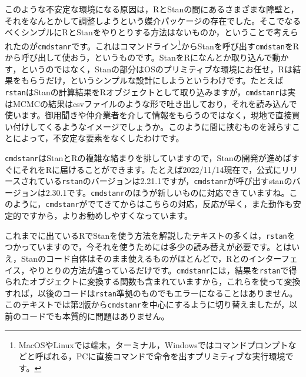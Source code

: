 \documentclass{ltjsbook}
\begin{document}
このような不安定な環境になる原因は，RとStanの間にあるさまざまな障壁と，それをなんとかして調整しようという媒介パッケージの存在でした。そこでなるべくシンプルにRとStanをやりとりする方法はないものか，ということで考えられたのが\verb|cmdstanr|です。これはコマンドライン\footnote{MacOSやLinuxでは端末，ターミナル，Windowsではコマンドプロンプトなどと呼ばれる，PCに直接コマンドで命令を出すプリミティブな実行環境です。}からStanを呼び出す\verb|cmdstan|をRから呼び出して使おう，というものです。StanをRになんとか取り込んで動かす，というのではなく，Stanの部分はOSのプリミティブな環境にお任せ，Rは結果をもらうだけ，というシンプルな設計にしようというわけです。たとえば\verb|rstan|はStanの計算結果をRオブジェクトとして取り込みますが，\verb|cmdstanr|は実はMCMCの結果はcsvファイルのような形で吐き出しており，それを読み込んで使います。御用聞きや仲介業者を介して情報をもらうのではなく，現地で直接買い付けしてくるようなイメージでしょうか。このように間に挟むものを減らすことによって，不安定な要素をなくしたわけです。

\verb|cmdstanr|はStanとRの複雑な絡まりを排していますので，Stanの開発が進めばすぐにそれをRに届けることができます。たとえば2022/11/14現在で，公式にリリースされている\verb|rstan|のバージョンは2.21.1ですが，\verb|cmdstanr|が呼び出すstanのバージョンは2.30.1です。\verb|cmdstanr|のほうが新しいものに対応できていますね。このように，\verb|cmdstanr|がでてきてからはこちらの対応，反応が早く，また動作も安定的ですから，よりお勧めしやすくなっています。

これまでに出ているRでStanを使う方法を解説したテキストの多くは，\verb|rstan|をつかっていますので，今それを使うためには多少の読み替えが必要です。とはいえ，Stanのコード自体はそのまま使えるものがほとんどで，Rとのインターフェイス，やりとりの方法が違っているだけです。\verb|cmdstanr|には，結果を\verb|rstan|で得られたオブジェクトに変換する関数も含まれていますから，これらを使って変換すれば，以後のコードは\verb|rstan|準拠のものでもエラーになることはありません。このテキストでは第2版から\verb|cmdstanr|を中心にするように切り替えましたが，以前のコードでも本質的に問題はありません。
\end{document}
